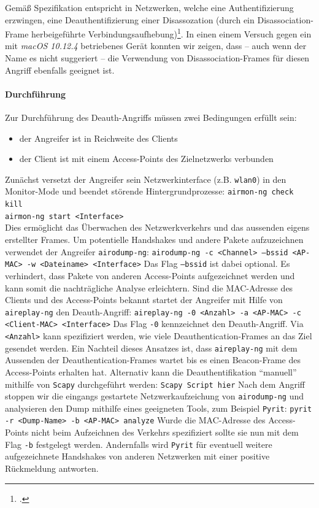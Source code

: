 Gemäß Spezifikation entspricht in Netzwerken, welche eine Authentifizierung erzwingen, eine Deauthentifizierung einer Disassozation (durch ein Disassociation-Frame herbeigeführte Verbindungsaufhebung)\footcite[S. 74, S. 442]{ieee802.11}. In einen einem Versuch gegen ein mit \textit{macOS 10.12.4} betriebenes Gerät konnten wir zeigen, dass -- auch wenn der Name es nicht suggeriert -- die Verwendung von Disassociation-Frames für diesen Angriff ebenfalls geeignet ist.

\paragraph{Durchführung}
Zur Durchführung des Deauth-Angriffs müssen zwei Bedingungen erfüllt sein: 
\begin{itemize}
	\item der Angreifer ist in Reichweite des Clients
	\item der Client ist mit einem Access-Points des Zielnetzwerks verbunden 
\end{itemize}
Zunächst versetzt der Angreifer sein Netzwerkinterface (z.B. \texttt{wlan0}) in den Monitor-Mode und beendet störende Hintergrundprozesse:
\texttt{airmon-ng check kill}\\
\texttt{airmon-ng start <Interface>}\\
Dies ermöglicht das Überwachen des Netzwerkverkehrs und das aussenden eigens erstellter Frames.
Um potentielle Handshakes und andere Pakete aufzuzeichnen verwendet der Angreifer \texttt{airodump-ng}:
\texttt{airodump-ng -c <Channel> --bssid <AP-MAC> -w <Dateiname> <Interface>}
Das Flag \texttt{--bssid} ist dabei optional.
Es verhindert, dass Pakete von anderen Access-Points aufgezeichnet werden und kann somit die nachträgliche Analyse erleichtern.
Sind die MAC-Adresse des Clients und des Access-Points bekannt startet der Angreifer mit Hilfe von \texttt{aireplay-ng} den Deauth-Angriff: 
\texttt{aireplay-ng -0 <Anzahl> -a <AP-MAC> -c <Client-MAC> <Interface>}
Das Flag \texttt{-0} kennzeichnet den Deauth-Angriff.
Via \texttt{<Anzahl>} kann spezifiziert werden, wie viele Deauthentication-Frames an das Ziel gesendet werden.
Ein Nachteil dieses Ansatzes ist, dass \texttt{aireplay-ng} mit dem Aussenden der Deauthentication-Frames wartet bis es einen Beacon-Frame des Access-Points erhalten hat.
Alternativ kann die Deauthentifikation \enquote{manuell} mithilfe von \texttt{Scapy} durchgeführt werden:
\texttt{Scapy Script hier}
Nach dem Angriff stoppen wir die eingangs gestartete Netzwerkaufzeichung von \texttt{airodump-ng} und analysieren den Dump mithilfe eines geeigneten Tools, zum Beispiel \texttt{Pyrit}:
\texttt{pyrit -r <Dump-Name> -b <AP-MAC> analyze}
Wurde die MAC-Adresse des Access-Points nicht beim Aufzeichnen des Verkehrs spezifiziert sollte sie nun mit dem Flag \texttt{-b} festgelegt werden.
Andernfalls wird \texttt{Pyrit} für eventuell weitere aufgezeichnete Handshakes von anderen Netzwerken mit einer positive Rückmeldung antworten.

